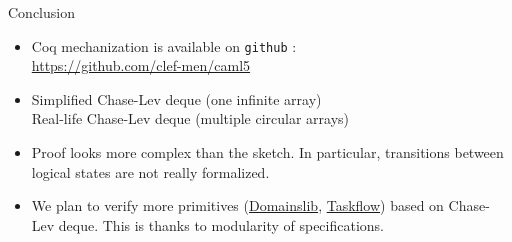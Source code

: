 \begin{frame}{Conclusion}
\begin{itemize}
	\setlength\itemsep{2em}
	\item
		Coq mechanization is available on \texttt{github} : \\
		\url{https://github.com/clef-men/caml5}
	\item
		Simplified Chase-Lev deque (one infinite array) \hfill \cmark \\
		Real-life Chase-Lev deque (multiple circular arrays) \hfill \ucmark
	\item
		Proof looks more complex than the sketch.
		In particular, transitions between logical states are not really formalized.
	\item
		We plan to verify more primitives (\href{https://github.com/ocaml-multicore/domainslib}{Domainslib}, \href{https://github.com/taskflow/taskflow}{Taskflow}) based on Chase-Lev deque.
		This is thanks to modularity of \Iris specifications.
\end{itemize}
\end{frame}